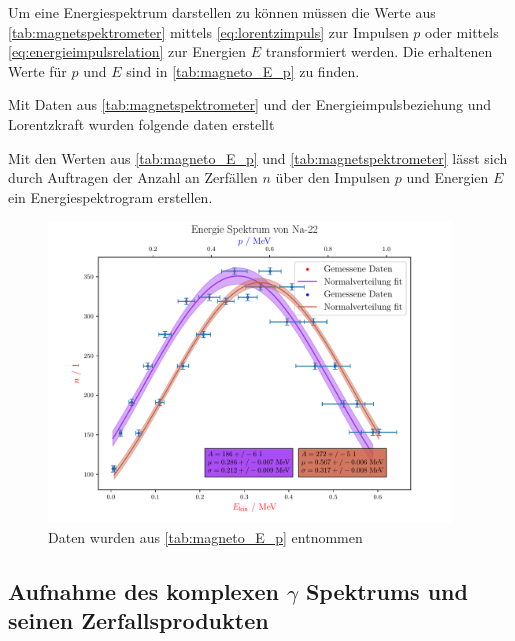 \documentclass[12pt,english,ngerman]{scrartcl}
\begin{document}
Um eine Energiespektrum darstellen zu können müssen die Werte aus
\autoref{tab:magnetspektrometer} mittels \autoref{eq:lorentzimpuls} zur
Impulsen $p$ oder mittels \autoref{eq:energieimpulsrelation} zur Energien $E$
transformiert werden. Die erhaltenen Werte für $p$ und $E$ sind in
\autoref{tab:magneto_E_p} zu finden.

\begin{table}[H]
  \caption{Mit Daten aus \autoref{tab:magnetspektrometer} und der
  Energieimpulsbeziehung und Lorentzkraft wurden folgende daten erstellt}
  \label{tab:magneto_E_p}
  \centering
  
\end{table}

Mit den Werten aus \autoref{tab:magneto_E_p} und
\autoref{tab:magnetspektrometer} lässt sich durch Auftragen der Anzahl an
Zerfällen $n$ über den Impulsen $p$ und Energien $E$ ein Energiespektrogram
erstellen.

\begin{figure}[H]
  \begin{center}
    \includegraphics[width = 0.95\textwidth]{figures/energiespektrum.pdf}
  \end{center}
  \caption{Daten wurden aus \autoref{tab:magneto_E_p} entnommen}
  \label{fig:magneto_E_p}
\end{figure}


\subsection{Aufnahme des komplexen \texorpdfstring{$\gamma$}{gamma} Spektrums
und seinen Zerfallsprodukten}
\end{document}
